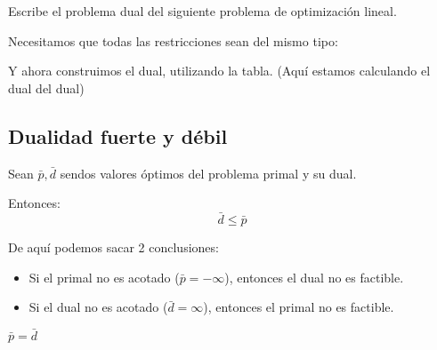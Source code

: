 \begin{example}
Escribe el problema dual del siguiente problema de optimización lineal.

\begin{ioprob}
\end{ioprob}


Necesitamos que todas las restricciones sean del mismo tipo:

\begin{ioprob}
\end{ioprob}

Y ahora construimos el dual, utilizando la tabla. (Aquí estamos calculando el dual del dual)

\begin{ioprob}
\end{ioprob}

\end{example}

\subsection{Dualidad fuerte y débil}


\begin{defn}
Sean $\bar{p},\bar{d}$ sendos valores óptimos del problema primal y su dual.

Entonces:\[\bar{d} ≤ \bar{p}\]
\end{defn}

De aquí podemos sacar 2 conclusiones:

\begin{itemize}
	\item Si el primal no es acotado ($\bar{p} = -∞$), entonces el dual no es factible.
	\item Si el dual no es acotado ($\bar{d} = ∞$), entonces el primal no es factible.
\end{itemize}


\begin{defn}
$\bar{p} = \bar{d}$
\end{defn}


